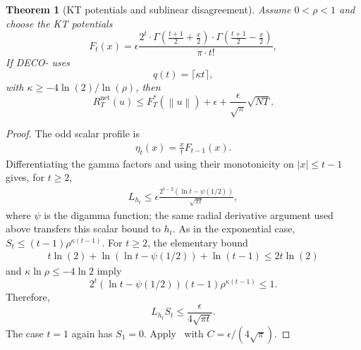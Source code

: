 \documentclass[journal]{IEEEtran}
\newtheorem{theorem}{Theorem}
\newcommand{\br}[1]{\left(#1\right)}
\newcommand{\norm}[1]{\left\lVert{#1}\right\rVert}
\newcommand{\algname}{{DECO}\xspace}
\begin{document}
    {\color{blue}
        \begin{theorem}[KT potentials and sublinear disagreement]\label{thm:KT-disagreement}
            Assume $0<\rho<1$ and choose the KT potentials
            \begin{equation}
                F_t(x) = \epsilon \frac{2^t \cdot \Gamma\br{\frac{t+1}{2} + \frac{x}{2}} \cdot \Gamma\br{\frac{t+1}{2} - \frac{x}{2}}}{\pi \cdot t!},
            \end{equation}
            If \algname{}- uses
            \begin{equation}
                q(t)=\lceil\kappa t\rceil,
            \end{equation}
            with $\kappa\geq-4\ln(2)/\ln(\rho)$, then
            \begin{equation}
                R_T^{\mathrm{net}}(u)
                \leq F_T^*(\norm{u})+\epsilon
                +\frac{\epsilon}{\sqrt{\pi}}\sqrt{NT}.
            \end{equation}
        \end{theorem}
        \begin{proof}
            The odd scalar profile is
            \begin{align}
                \eta_t(x)=\frac{x}{t}F_{t-1}(x).
            \end{align}
            Differentiating the gamma factors and using their monotonicity on $|x|\leq t-1$ gives, for $t\geq2$,
            \begin{align}
                L_{h_t}
                \leq\epsilon\frac{2^{t-2}\br{\ln t-\psi(1/2)}}{\sqrt{\pi t}},
            \end{align}
            where $\psi$ is the digamma function; the same radial derivative argument used above transfers this scalar bound to $h_t$.
            As in the exponential case, $S_t\leq(t-1)\rho^{\kappa(t-1)}$.
            For $t\geq2$, the elementary bound
            \begin{align*}
                t\ln(2) + \ln(\ln t - \psi(1/2)) + \ln(t-1) \leq 2 t \ln(2)
            \end{align*}
            and $\kappa\ln\rho\leq-4\ln2$ imply
            \begin{equation}
                2^t\br{\ln t-\psi(1/2)}(t-1)\rho^{\kappa(t-1)}\leq1.
            \end{equation}
            Therefore,
            \begin{equation}
                L_{h_t}S_t\leq\frac{\epsilon}{4\sqrt{\pi t}}.
            \end{equation}
            The case $t=1$ again has $S_1=0$.
            Apply~ with $C=\epsilon/(4\sqrt{\pi})$.
        \end{proof}
    }
\end{document}
